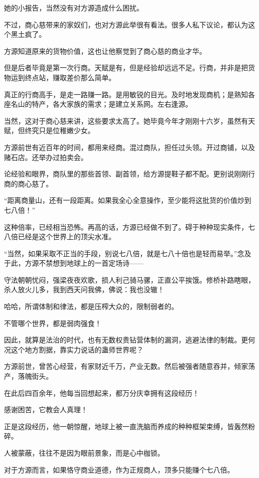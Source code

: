 \begin{this_body}
她的小报告，当然没有对方源造成什么困扰。

不过，商心慈带来的家奴们，也对方源此举很有看法。很多人私下议论，都认为这个黑土疯了。

方源知道原来的货物价值，这也让他察觉到了商心慈的商业才华。

但是后者毕竟是第一次行商。天赋是有，但是经验却远远不足。行商，并非是把货物运到终点站，赚取差价那么简单。

真正的行商高手，是走一路赚一路。是用敏锐的目光。及时地发现商机；是熟知各座名山的特产，各大家族的需求；是建立关系网。左右逢源。

当然，这对于商心慈来讲，这些要求太高了。她毕竟今年才刚刚十六岁，虽然有天赋，但终究只是位稚嫩少女。

方源前世有近百年的时间，都用来经商。混过商队，担任过头领。开过商铺，以及赌石店。还举办过拍卖会。

论经验和眼界，商队里的那些首领、副首领，给方源提鞋子都不配。更别说刚刚行商的商心慈了。

“距离商量山，还有一段距离。如果我全心全意操作，至少能将这批货的价值炒到七八倍！”

这种倍率，已经相当恐怖。再高的话，方源已经做不到了。碍于种种现实条件，七八倍已经是这个世界上的顶尖水准。

“当然，如果采取不正当的手段，别说七八倍，就是七八十倍也是轻而易举。”念及于此，方源不禁想到地球上的一首定场诗——

守法朝朝忧闷，强梁夜夜欢歌，损人利己骑马骡，正直公平挨饿。修桥补路瞎眼，杀人放火儿多，我到西天问我佛，佛说：我也没辙！

哈哈，所谓体制和律法，都是压榨大众的，限制弱者的。

不管哪个世界，都是弱肉强食！

因此，就算是法治的时代，也有无数权贵钻营体制的漏洞，逃避法律的制裁。更何况这个地方割据，靠实力说话的蛊师世界呢？

方源前世，曾苦心经营，有家财近千万，产业无数。然后被强者随意吞并，倾家荡产，落魄街头。

在此后四百余年，他每当回想起来，都万分庆幸拥有这段经历！

感谢困苦，它教会人真理！

正是这段经历，他一朝惊醒，地球上被一直洗脑而养成的种种框架束缚，皆轰然粉碎。

人被蒙蔽，往往不是因为眼前景象，而是心中枷锁。

对于方源而言，如果恪守商业道德，作为正规商人，顶多只能赚个七八倍。


\end{this_body}
